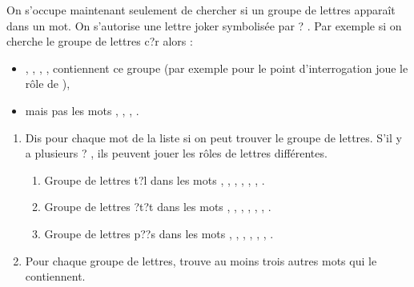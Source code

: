 \documentclass[class=report,crop=false, 12pt]{standalone}
\begin{document}
\begin{activite}

On s'occupe maintenant seulement de chercher si un groupe de lettres apparaît dans un mot. On s'autorise une lettre joker symbolisée par \og ? \fg{}. Par exemple si on cherche le groupe de lettres \og c\!?r \fg{} alors :

\begin{itemize}
  \item {}, , , ,  contiennent ce groupe (par exemple pour  le point d'interrogation joue le rôle de ),
  \item  mais pas les mots , , , . 
\end{itemize}

\begin{enumerate}
  \item Dis pour chaque mot de la liste si on peut trouver le groupe de lettres. S'il y a plusieurs \og ? \fg{}, ils peuvent jouer les rôles de lettres différentes.
  \begin{enumerate}
    \item Groupe de lettres \og t\!?l \fg{} dans les mots , , , , , , .
    \item Groupe de lettres \og \!?t\!?t \fg{} dans les mots , , , , , , .
    \item Groupe de lettres \og p\!?\!?s \fg{} dans les mots , , , , , , .
  \end{enumerate}
  
     
  \item Pour chaque groupe de lettres, trouve au moins trois autres mots qui le contiennent.
\end{enumerate}

\end{activite}
\end{document}
